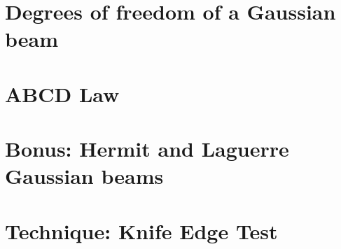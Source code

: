 \section{Degrees of freedom of a Gaussian beam}

\section{ABCD Law}



\section{Bonus: Hermit and Laguerre Gaussian beams}


\section{Technique: Knife Edge Test}





\printbibliography[segment=\therefsegment,heading=subbibliography]
